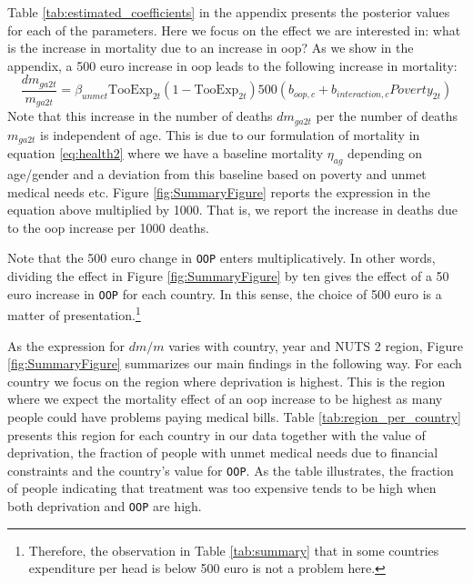 \documentclass[a4paper,12pt]{article}
\begin{document}
Table \ref{tab:estimated_coefficients} in the appendix presents the posterior values for each of the parameters. Here we focus on the effect we are interested in: what is the increase in mortality due to an increase in oop? As we show in the appendix, a 500 euro increase in oop leads to the following increase in mortality:
\begin{equation}
\label{eq:change_mortality}
\frac{dm_{ga2t}}{m_{ga2t}} = \beta_{unmet} \text{TooExp}_{2t}(1-\text{TooExp}_{2t}) 500 (b_{oop,c}+b_{interaction,c} Poverty_{2t})
\end{equation}
Note that this increase in the number of deaths \(dm_{ga2t}\) per the number of deaths \(m_{ga2t}\) is independent of age. This is due to our formulation of mortality in equation \eqref{eq:health2} where we have a baseline mortality \(\eta_{ag}\) depending on age/gender and a deviation from this baseline based on poverty and unmet medical needs etc. Figure \ref{fig:SummaryFigure} reports the expression in the equation above multiplied by 1000. That is, we report the increase in deaths due to the oop increase per 1000 deaths.

Note that the 500 euro change in \texttt{OOP} enters multiplicatively. In other words, dividing the effect in Figure \ref{fig:SummaryFigure} by ten gives the effect of a 50 euro increase in \texttt{OOP} for each country. In this sense, the choice of 500 euro is a matter of presentation.\footnote{Therefore, the observation in Table \ref{tab:summary} that in some countries expenditure per head is below 500 euro is not a problem here.}

As the expression for \(dm/m\) varies with country, year and NUTS 2 region, Figure \ref{fig:SummaryFigure} summarizes our main findings in the following way. For each country we focus on the region where deprivation is highest. This is the region where we expect the mortality effect of an oop increase to be highest as many people could have problems paying medical bills. Table \ref{tab:region_per_country} presents this region for each country in our data together with the value of deprivation, the fraction of people with unmet medical needs due to financial constraints and the country's value for \texttt{OOP}. As the table illustrates, the fraction of people indicating that treatment was too expensive tends to be high when both deprivation and \texttt{OOP} are high.
\end{document}
